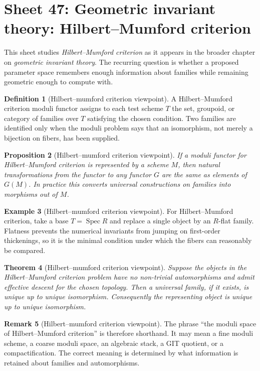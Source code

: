 \documentclass[11pt]{amsart}
\newtheorem{theorem}{Theorem}[section]
\newtheorem{proposition}[theorem]{Proposition}
\theoremstyle{definition}
\newtheorem{definition}[theorem]{Definition}
\newtheorem{example}[theorem]{Example}
\newtheorem{remark}[theorem]{Remark}
\newcommand{\Spec}{\operatorname{Spec}}
\begin{document}
\section{Sheet 47: Geometric invariant theory: Hilbert--Mumford criterion}
This sheet studies \emph{Hilbert--Mumford criterion} as it appears in the broader chapter on \emph{geometric invariant theory}.  The recurring question is whether a proposed parameter space remembers enough information about families while remaining geometric enough to compute with.
\begin{definition}[Hilbert--mumford criterion viewpoint]
A Hilbert--Mumford criterion moduli functor assigns to each test scheme $T$ the set, groupoid, or category of families over $T$ satisfying the chosen condition.  Two families are identified only when the moduli problem says that an isomorphism, not merely a bijection on fibers, has been supplied.
\end{definition}
\begin{proposition}[Hilbert--mumford criterion viewpoint]
If a moduli functor for Hilbert--Mumford criterion is represented by a scheme $M$, then natural transformations from the functor to any functor $G$ are the same as elements of $G(M)$.  In practice this converts universal constructions on families into morphisms out of $M$.
\end{proposition}
\begin{example}[Hilbert--mumford criterion viewpoint]
For Hilbert--Mumford criterion, take a base $T=\Spec R$ and replace a single object by an $R$-flat family.  Flatness prevents the numerical invariants from jumping on first-order thickenings, so it is the minimal condition under which the fibers can reasonably be compared.
\end{example}
\begin{theorem}[Hilbert--mumford criterion viewpoint]
Suppose the objects in the Hilbert--Mumford criterion problem have no non-trivial automorphisms and admit effective descent for the chosen topology.  Then a universal family, if it exists, is unique up to unique isomorphism.  Consequently the representing object is unique up to unique isomorphism.
\end{theorem}
\begin{remark}[Hilbert--mumford criterion viewpoint]
The phrase ``the moduli space of Hilbert--Mumford criterion'' is therefore shorthand.  It may mean a fine moduli scheme, a coarse moduli space, an algebraic stack, a GIT quotient, or a compactification.  The correct meaning is determined by what information is retained about families and automorphisms.
\end{remark}
\end{document}
